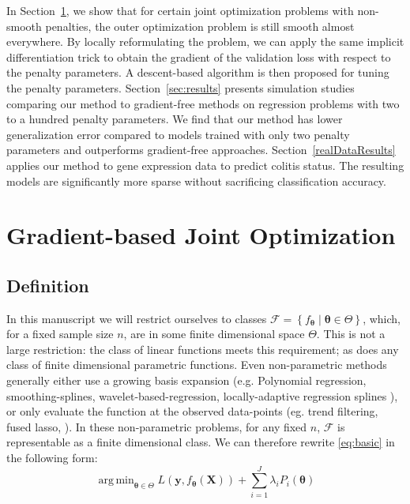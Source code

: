 \documentclass[12pt]{article}
\DeclareMathOperator*{\argmin}{arg\,min}
\begin{document}
In Section~\ref{defineDescJointOpt}, we show that for certain joint optimization problems with non-smooth penalties, the outer optimization problem is still smooth almost everywhere. By locally reformulating the problem, we can apply the same implicit differentiation trick to obtain the gradient of the validation loss with respect to the penalty parameters. A descent-based algorithm is then proposed for tuning the penalty parameters. Section~\ref{sec:results} presents simulation studies comparing our method to gradient-free methods on regression problems with two to a hundred penalty parameters. We find that our method has lower generalization error compared to models trained with only two penalty parameters and outperforms gradient-free approaches. Section~\ref{realDataResults} applies our method to gene expression data to predict colitis status. The resulting models are significantly more sparse without sacrificing classification accuracy.

\section{Gradient-based Joint Optimization}\label{defineDescJointOpt}
\subsection{Definition}
In this manuscript we will restrict ourselves to classes $\mathcal{F} = \left\{f_{\boldsymbol \theta}\middle| \boldsymbol \theta\in\Theta\right\}$, which, for a fixed sample size $n$, are in some finite dimensional space $\Theta$. This is not a large restriction: the class of linear functions meets this requirement; as does any class of finite dimensional parametric functions. Even non-parametric methods generally either use a growing basis expansion (e.g. Polynomial regression, smoothing-splines, wavelet-based-regression, locally-adaptive regression splines \citep{tsybakov2008introduction, wahba1981spline, donoho1994ideal, mammen1997locally}), or only evaluate the function at the observed data-points (eg. trend filtering, fused lasso, \citep{kim2009ell_1, tibshirani2005sparsity}). In these non-parametric problems, for any fixed $n$, $\mathcal{F}$ is representable as a finite dimensional class.
We can therefore rewrite \eqref{eq:basic} in the following form:
\begin{equation}\label{eq:train_disc}
\argmin_{\boldsymbol \theta \in \Theta} L(\boldsymbol{y}, f_{\boldsymbol \theta}(\boldsymbol{X})) + \sum\limits_{i=1}^J \lambda_i P_i(\boldsymbol \theta)
\end{equation}
\end{document}
